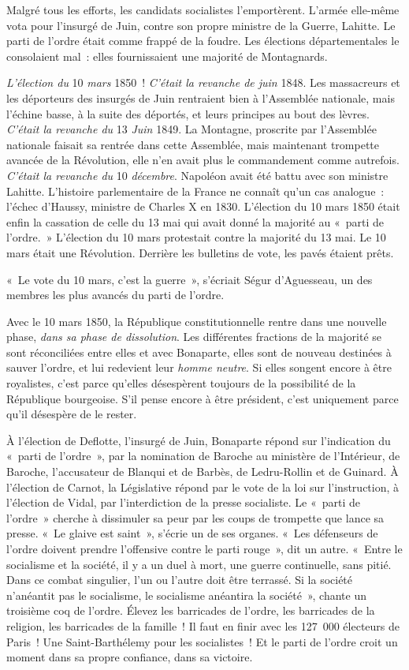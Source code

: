 \documentclass[twoside]{book} %
\begin{document}
Malgré tous les efforts, les candidats socialistes l’emportèrent. L’armée elle-même vota pour l’insurgé de Juin, contre son propre ministre de la Guerre, Lahitte. Le parti de l’ordre était comme frappé de la foudre. Les élections départementales le consolaient mal : elles fournissaient une majorité de Montagnards.\par
\emph{L’élection du} 10 \emph{mars} 1850 ! \emph{C’était la revanche de juin} 1848. Les massacreurs et les déporteurs des insurgés de Juin rentraient bien à l’Assemblée nationale, mais l’échine basse, à la suite des déportés, et leurs principes au bout des lèvres. \emph{C’était la revanche du} 13 \emph{Juin} 1849. La Montagne, proscrite par l’Assemblée nationale faisait sa rentrée dans cette Assemblée, mais maintenant trompette avancée de la Révolution, elle n’en avait plus le commandement comme autrefois. \emph{C’était la revanche du} 10 \emph{décembre}. Napoléon avait été battu avec son ministre Lahitte. L’histoire parlementaire de la France ne connaît qu’un cas analogue : l’échec d’Haussy, ministre de Charles X en 1830. L’élection du 10 mars 1850 était enfin la cassation de celle du 13 mai qui avait donné la majorité au « parti de l’ordre. » L’élection du 10 mars protestait contre la majorité du 13 mai. Le 10 mars était une Révolution. Derrière les bulletins de vote, les pavés étaient prêts.\par
« Le vote du 10 mars, c’est la guerre », s’écriait Ségur d’Aguesseau, un des membres les plus avancés du parti de l’ordre.\par
Avec le 10 mars 1850, la République constitutionnelle rentre dans une nouvelle phase, \emph{dans sa phase de dissolution}. Les différentes fractions de la majorité se sont réconciliées entre elles et avec Bonaparte, elles sont de nouveau destinées à sauver l’ordre, et lui redevient leur \emph{homme neutre}. Si elles songent encore à être royalistes, c’est parce qu’elles désespèrent toujours de la possibilité de la République bourgeoise. S’il pense encore à être président, c’est uniquement parce qu’il désespère de le rester.\par
À l’élection de Deflotte, l’insurgé de Juin, Bonaparte répond sur l’indication du « parti de l’ordre », par la nomination de Baroche au ministère de l’Intérieur, de Baroche, l’accusateur de Blanqui et de Barbès, de Ledru-Rollin et de Guinard. À l’élection de Carnot, la Législative répond par le vote de la loi sur l’instruction, à l’élection de Vidal, par l’interdiction de la presse socialiste. Le « parti de l’ordre » cherche à dissimuler sa peur par les coups de trompette que lance sa presse. « Le glaive est saint », s’écrie un de ses organes. « Les défenseurs de l’ordre doivent prendre l’offensive contre le parti rouge », dit un autre. « Entre le socialisme et la société, il y a un duel à mort, une guerre continuelle, sans pitié. Dans ce combat singulier, l’un ou l’autre doit être terrassé. Si la société n’anéantit pas le socialisme, le socialisme anéantira la société », chante un troisième coq de l’ordre. Élevez les barricades de l’ordre, les barricades de la religion, les barricades de la famille ! Il faut en finir avec les 127 000 électeurs de Paris ! Une Saint-Barthélemy pour les socialistes ! Et le parti de l’ordre croit un moment dans sa propre confiance, dans sa victoire.\par
\end{document}
